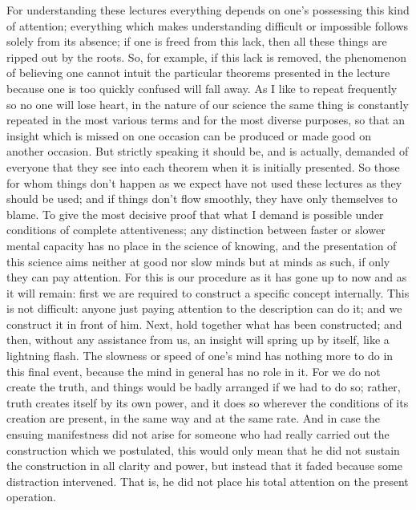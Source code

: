 For understanding these lectures everything depends
on one’s possessing this kind of attention;
everything which makes understanding difficult
or impossible follows solely from its absence;
if one is freed from this lack,
then all these things are ripped out by the roots.
So, for example, if this lack is removed,
the phenomenon of believing one cannot intuit
the particular theorems presented in the lecture
because one is too quickly confused will fall away.
As I like to repeat frequently so no one will lose heart,
in the nature of our science the same thing is
constantly repeated in the most various terms
and for the most diverse purposes,
so that an insight which is
missed on one occasion can be produced
or made good on another occasion.
But strictly speaking it should be, and is actually,
demanded of everyone that they see into each theorem
when it is initially presented.
So those for whom things don’t happen as we expect
have not used these lectures as they should be used;
and if things don’t flow smoothly,
they have only themselves to blame.
To give the most decisive proof that
what I demand is possible under conditions
of complete attentiveness;
any distinction between faster or slower mental capacity has
no place in the science of knowing,
and the presentation of this science aims
neither at good nor slow minds
but at minds as such,
if only they can pay attention.
For this is our procedure as it has gone up to now
and as it will remain:
first we are required to construct
a specific concept internally.
This is not difficult:
anyone just paying attention to the
description can do it;
and we construct it in front of him.
Next, hold together what has been constructed;
and then, without any assistance from us,
an insight will spring up by itself,
like a lightning flash.
The slowness or speed of one’s mind has
nothing more to do in this final event,
because the mind in general has no role in it.
For we do not create the truth,
and things would be badly arranged
if we had to do so;
rather, truth creates itself by its own power,
and it does so wherever the conditions
of its creation are present,
in the same way and at the same rate.
And in case the ensuing manifestness did not arise
for someone who had really carried out
the construction which we postulated,
this would only mean that he did not sustain
the construction in all clarity and power,
but instead that it faded
because some distraction intervened.
That is, he did not place his total attention
on the present operation.

